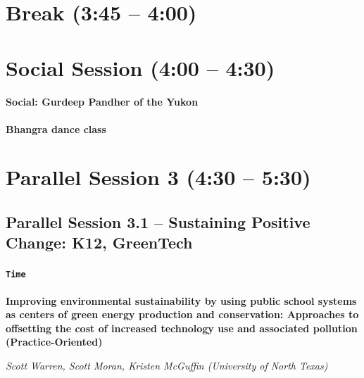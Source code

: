 \documentclass[
]{book}
\begin{document}
\hypertarget{break-345-400}{%
\section*{Break (3:45 -- 4:00)}\label{break-345-400}}

\hypertarget{social-session-400-430}{%
\section*{Social Session (4:00 -- 4:30)}\label{social-session-400-430}}

\begin{gh}
\hypertarget{social-gurdeep-pandher-of-the-yukon}{%
\paragraph*{Social: Gurdeep Pandher of the
Yukon}\label{social-gurdeep-pandher-of-the-yukon}}

\textbf{Bhangra dance class}
\end{gh}

\hypertarget{parallel-session-3-430-530}{%
\section*{Parallel Session 3 (4:30 -- 5:30)}\label{parallel-session-3-430-530}}

\hypertarget{parallel-session-3.1-sustaining-positive-change-k12-greentech}{%
\subsection*{Parallel Session 3.1 -- Sustaining Positive Change: K12, GreenTech}\label{parallel-session-3.1-sustaining-positive-change-k12-greentech}}

\begin{secondary}
\hypertarget{time}{%
\paragraph{\texorpdfstring{\texttt{Time}}{Time}}\label{time}}

\textbf{Improving environmental sustainability by using public school
systems as centers of green energy production and conservation:
Approaches to offsetting the cost of increased technology use and
associated pollution (Practice-Oriented)}

\emph{Scott Warren, Scott Moran, Kristen McGuffin (University of North
Texas)}
\end{secondary}
\end{document}
